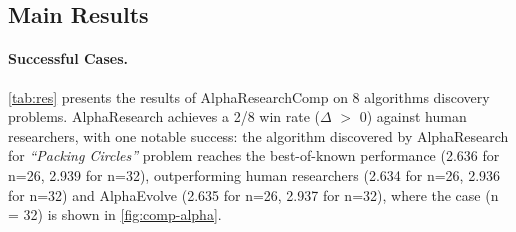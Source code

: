 

\subsection{Main Results}
\paragraph{Successful Cases.}

\autoref{tab:res}
presents the results of AlphaResearchComp on 8 algorithms discovery problems. AlphaResearch achieves a 2/8 win rate ($\Delta$ $>$ 0) against human researchers, with one notable success: the algorithm discovered by AlphaResearch for \emph{``Packing Circles''} problem reaches the best-of-known performance (2.636 for n=26, 2.939 for n=32), outperforming human researchers (2.634 for n=26, 2.936 for n=32) and AlphaEvolve (2.635 for n=26, 2.937 for n=32), where the case (n = 32) is shown in \autoref{fig:comp-alpha}.



